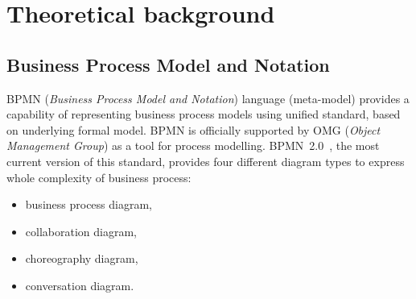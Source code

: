 \chapter{Theoretical background}
\label{cha:background}
\section{Business Process Model and Notation}
\label{sec:bpmn}
BPMN (\emph{Business Process Model and Notation}) language (meta-model) provides a capability of representing business process models using unified standard, based on underlying formal model. BPMN is officially supported by OMG (\emph{Object Management Group}) as a tool for process modelling. BPMN~2.0~\cite{BPMN20}, the most current version of this standard, provides four different diagram types to express whole complexity of business process:
\begin{itemize}
	\item business process diagram,
	\item collaboration diagram,
	\item choreography diagram,
	\item conversation diagram.
\end{itemize}

